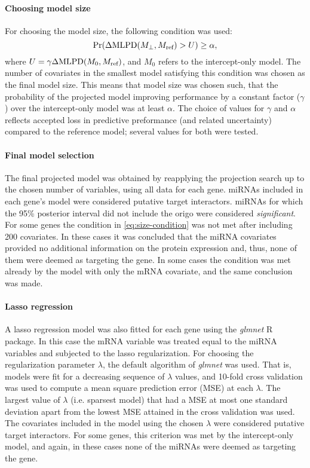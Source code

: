 \paragraph{Choosing model size}
For choosing the model size, the following condition was used:
\begin{equation}
	\label{eq:size-condition}
	\textup{Pr}(\Delta \textup{MLPD}(M_\perp,M_{\textup{ref}}) > U) \geq \alpha,
\end{equation}
where $U = \gamma \Delta \textup{MLPD}(M_0,M_{\textup{ref}})$, and $M_0$
refers to the intercept-only model. The number of covariates in the smallest model satisfying this condition
was chosen as the final model size. This means that model size was chosen
such, that the probability of the projected model improving performance
by a constant factor ($\gamma$) over the intercept-only model
was at least $\alpha$. The choice of values for $\gamma$ and $\alpha$
reflects accepted loss in predictive preformance (and related
uncertainty) compared to the reference model; several values for
both were tested.

\paragraph{Final model selection}
The final projected model was obtained by reapplying the projection search up to
the chosen number of variables, using all data for each gene. miRNAs included
in each gene's model were considered putative target interactors. miRNAs for
which the 95\% posterior interval did not include the origo were considered
\emph{significant}. For some genes the condition in \eqref{eq:size-condition} was not
met after including 200 covariates. In these cases it was concluded that the
miRNA covariates provided no additional information on the protein expression
and, thus, none of them were deemed as targeting the gene. In some cases the
condition was met already by the model with only the mRNA covariate, and the
same conclusion was made.

\paragraph{Lasso regression}
A lasso regression model was also fitted for each gene using the
\emph{glmnet} R package. In this case the mRNA variable was treated equal
to the miRNA variables and subjected to the lasso regularization. For choosing
the regularization parameter $\lambda$, the default algorithm of \emph{glmnet}
was used. That is, models were fit for a decreasing sequence of $\lambda$
values, and 10-fold cross validation was used to compute a mean square
prediction error (MSE) at each $\lambda$. The largest value of $\lambda$ (i.e.
sparsest model) that had a MSE at most one standard deviation apart from the
lowest MSE attained in the cross validation was used. The covariates included
in the model using the chosen $\lambda$ were considered putative target
interactors. For some genes, this criterion was met by the intercept-only
model, and again, in these cases none of the miRNAs were deemed as targeting
the gene.



